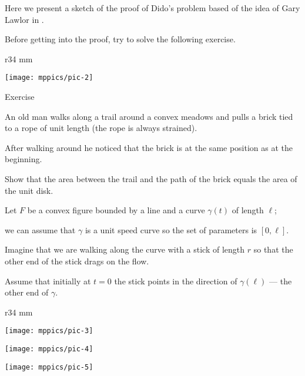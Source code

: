 Here we present a sketch of the proof of Dido's problem based of the idea of Gary Lawlor in \cite{lawlor}.

Before getting into the proof, try to solve the following exercise.



{



\begin{wrapfigure}{r}{34 mm}

\vskip-4mm

\centering

\texttt{[image: mppics/pic-2]}


\end{wrapfigure}



\begin{thm}{Exercise}

An old man walks along a trail around a convex meadows and pulls a brick tied to a rope of unit length (the rope is always strained).

After walking around he noticed that the brick is at the same position as at the beginning.

Show that the area between the trail and the path of the brick equals the area of the unit disk. 



\end{thm}



}




Let $F$ be a convex figure bounded by a line and a curve $\gamma(t)$ of length $\ell$;

we can assume that $\gamma$ is a unit speed curve so the set of parameters is $[0,\ell]$.



Imagine that we are walking along the curve with a stick of length $r$ so that the other end of the stick drags on the flow.

Assume that initially at $t=0$ the stick points in the direction of $\gamma(\ell)$ --- the other end of $\gamma$.



\begin{wrapfigure}{r}{34 mm}

\vskip-0mm

\centering

\texttt{[image: mppics/pic-3]}


\bigskip

\texttt{[image: mppics/pic-4]}


\bigskip

\texttt{[image: mppics/pic-5]}

\end{wrapfigure}



